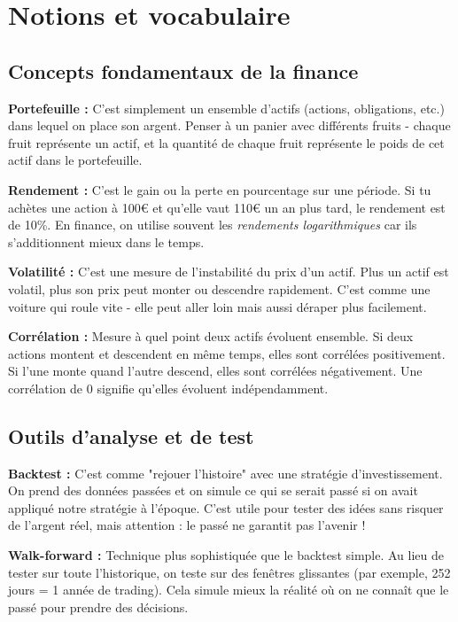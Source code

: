 \documentclass[11pt,a4paper]{article}
\begin{document}
\section{Notions et vocabulaire}

\subsection{Concepts fondamentaux de la finance}

\textbf{Portefeuille :} C'est simplement un ensemble d'actifs (actions, obligations, etc.) dans lequel on place son argent. Penser à un panier avec différents fruits - chaque fruit représente un actif, et la quantité de chaque fruit représente le poids de cet actif dans le portefeuille.

\textbf{Rendement :} C'est le gain ou la perte en pourcentage sur une période. Si tu achètes une action à 100€ et qu'elle vaut 110€ un an plus tard, le rendement est de 10\%. En finance, on utilise souvent les \emph{rendements logarithmiques} car ils s'additionnent mieux dans le temps.

\textbf{Volatilité :} C'est une mesure de l'instabilité du prix d'un actif. Plus un actif est volatil, plus son prix peut monter ou descendre rapidement. C'est comme une voiture qui roule vite - elle peut aller loin mais aussi déraper plus facilement.

\textbf{Corrélation :} Mesure à quel point deux actifs évoluent ensemble. Si deux actions montent et descendent en même temps, elles sont corrélées positivement. Si l'une monte quand l'autre descend, elles sont corrélées négativement. Une corrélation de 0 signifie qu'elles évoluent indépendamment.

\subsection{Outils d'analyse et de test}

\textbf{Backtest :} C'est comme "rejouer l'histoire" avec une stratégie d'investissement. On prend des données passées et on simule ce qui se serait passé si on avait appliqué notre stratégie à l'époque. C'est utile pour tester des idées sans risquer de l'argent réel, mais attention : le passé ne garantit pas l'avenir !

\textbf{Walk-forward :} Technique plus sophistiquée que le backtest simple. Au lieu de tester sur toute l'historique, on teste sur des fenêtres glissantes (par exemple, 252 jours = 1 année de trading). Cela simule mieux la réalité où on ne connaît que le passé pour prendre des décisions.
\end{document}
